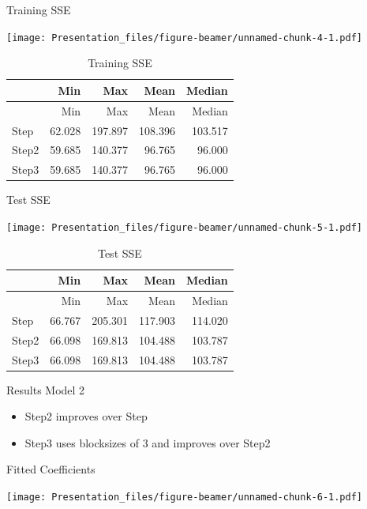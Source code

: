 \documentclass[ignorenonframetext,]{beamer}
\providecommand{\tightlist}{%
  \setlength{\itemsep}{0pt}\setlength{\parskip}{0pt}}
\begin{document}
\begin{frame}{Training SSE}

\texttt{[image: Presentation\_files/figure-beamer/unnamed-chunk-4-1.pdf]}

\begin{longtable}[]{@{}lrrrr@{}}
\caption{Training SSE}\tabularnewline
\toprule
& Min & Max & Mean & Median\tabularnewline
\midrule
\endfirsthead
\toprule
& Min & Max & Mean & Median\tabularnewline
\midrule
\endhead
Step & 62.028 & 197.897 & 108.396 & 103.517\tabularnewline
Step2 & 59.685 & 140.377 & 96.765 & 96.000\tabularnewline
Step3 & 59.685 & 140.377 & 96.765 & 96.000\tabularnewline
\bottomrule
\end{longtable}

\end{frame}

\begin{frame}{Test SSE}

\texttt{[image: Presentation\_files/figure-beamer/unnamed-chunk-5-1.pdf]}

\begin{longtable}[]{@{}lrrrr@{}}
\caption{Test SSE}\tabularnewline
\toprule
& Min & Max & Mean & Median\tabularnewline
\midrule
\endfirsthead
\toprule
& Min & Max & Mean & Median\tabularnewline
\midrule
\endhead
Step & 66.767 & 205.301 & 117.903 & 114.020\tabularnewline
Step2 & 66.098 & 169.813 & 104.488 & 103.787\tabularnewline
Step3 & 66.098 & 169.813 & 104.488 & 103.787\tabularnewline
\bottomrule
\end{longtable}

\end{frame}

\begin{frame}{Results Model 2}

\begin{itemize}
\tightlist
\item
  Step2 improves over Step
\item
  Step3 uses blocksizes of 3 and improves over Step2
\end{itemize}

\end{frame}

\begin{frame}{Fitted Coefficients}

\texttt{[image: Presentation\_files/figure-beamer/unnamed-chunk-6-1.pdf]}

\end{frame}
\end{document}
